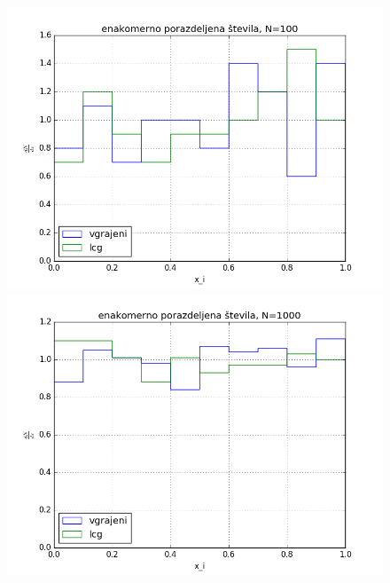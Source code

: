 \documentclass[slovene,11pt,a4paper]{article}
\numberwithin{equation}{section} %
\numberwithin{figure}{section} %
\numberwithin{table}{section} %
\begin{document}
\begin{figure}[h]
\centering
\begin{minipage}{0.5\textwidth}
\centering
\includegraphics[scale=0.4]{slike/enakomerna_porazdelitev_N100.png}
\end{minipage}\hfill
\begin{minipage}{0.5\textwidth}
\centering
\includegraphics[scale=0.4]{slike/enakomerna_porazdelitev_N1000.png}
\end{minipage}
\begin{minipage}{0.5\textwidth}
\centering

\end{minipage}
\end{figure}
\end{document}
